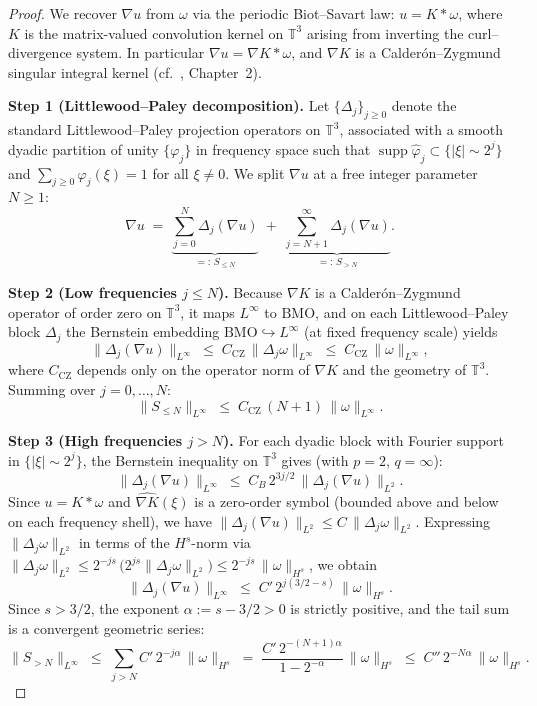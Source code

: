 \documentclass[12pt,a4paper]{article}
\theoremstyle{definition}
\theoremstyle{plain}
\theoremstyle{remark}
\begin{document}
\begin{proof}
We recover $\nabla u$ from $\omega$ via the periodic Biot--Savart law:
$u = K * \omega$, where $K$ is the matrix-valued convolution kernel on
$\mathbb{T}^3$ arising from inverting the curl--divergence system.  In
particular $\nabla u = \nabla K * \omega$, and $\nabla K$ is a
Calder\'{o}n--Zygmund singular integral kernel (cf.\ \cite{BertozziMajda2002},
Chapter~2).

\medskip
\noindent\textbf{Step 1 (Littlewood--Paley decomposition).}
Let $\{\Delta_j\}_{j\ge 0}$ denote the standard Littlewood--Paley projection
operators on $\mathbb{T}^3$, associated with a smooth dyadic partition of unity
$\{\varphi_j\}$ in frequency space such that
$\operatorname{supp}\hat\varphi_j \subset \{|\xi| \sim 2^j\}$ and
$\sum_{j\ge 0}\varphi_j(\xi) = 1$ for all $\xi \neq 0$.
We split $\nabla u$ at a free integer parameter $N \ge 1$:
\[
    \nabla u \;=\; \underbrace{\sum_{j=0}^{N} \Delta_j(\nabla u)}_{=:\,S_{\le N}}
                  \;+\; \underbrace{\sum_{j=N+1}^{\infty} \Delta_j(\nabla u)}_{=:\,S_{>N}}.
\]

\medskip
\noindent\textbf{Step 2 (Low frequencies $j \le N$).}
Because $\nabla K$ is a Calder\'{o}n--Zygmund operator of order zero on
$\mathbb{T}^3$, it maps $L^\infty$ to $\mathrm{BMO}$, and on each Littlewood--Paley
block $\Delta_j$ the Bernstein embedding
$\mathrm{BMO} \hookrightarrow L^\infty$ (at fixed frequency scale) yields
\[
    \|\Delta_j(\nabla u)\|_{L^\infty}
    \;\le\; C_{\mathrm{CZ}}\,\|\Delta_j \omega\|_{L^\infty}
    \;\le\; C_{\mathrm{CZ}}\,\|\omega\|_{L^\infty},
\]
where $C_{\mathrm{CZ}}$ depends only on the operator norm of $\nabla K$ and
the geometry of $\mathbb{T}^3$.  Summing over $j = 0, \ldots, N$:
\begin{equation}\label{eq:BS-low}
    \|S_{\le N}\|_{L^\infty}
    \;\le\; C_{\mathrm{CZ}}\,(N+1)\,\|\omega\|_{L^\infty}.
\end{equation}

\medskip
\noindent\textbf{Step 3 (High frequencies $j > N$).}
For each dyadic block with Fourier support in $\{|\xi| \sim 2^j\}$, the
Bernstein inequality on $\mathbb{T}^3$ gives (with $p=2$, $q=\infty$):
\[
    \|\Delta_j(\nabla u)\|_{L^\infty}
    \;\le\; C_B\,2^{3j/2}\,\|\Delta_j(\nabla u)\|_{L^2}.
\]
Since $u = K * \omega$ and $\widehat{\nabla K}(\xi)$ is a zero-order symbol
(bounded above and below on each frequency shell), we have
$\|\Delta_j(\nabla u)\|_{L^2} \le C\,\|\Delta_j \omega\|_{L^2}$.
Expressing $\|\Delta_j \omega\|_{L^2}$ in terms of the $H^s$-norm
via $\|\Delta_j\omega\|_{L^2} \le 2^{-js}\,\bigl(2^{js}\|\Delta_j\omega\|_{L^2}\bigr)
\le 2^{-js}\,\|\omega\|_{H^s}$, we obtain
\[
    \|\Delta_j(\nabla u)\|_{L^\infty}
    \;\le\; C'\,2^{j(3/2-s)}\,\|\omega\|_{H^s}.
\]
Since $s > 3/2$, the exponent $\alpha := s - 3/2 > 0$ is strictly positive,
and the tail sum is a convergent geometric series:
\begin{equation}\label{eq:BS-high}
    \|S_{>N}\|_{L^\infty}
    \;\le\; \sum_{j>N} C'\,2^{-j\alpha}\,\|\omega\|_{H^s}
    \;=\; \frac{C'\,2^{-(N+1)\alpha}}{1 - 2^{-\alpha}}\,\|\omega\|_{H^s}
    \;\le\; C''\,2^{-N\alpha}\,\|\omega\|_{H^s}.
\end{equation}


\end{proof}
\end{document}
